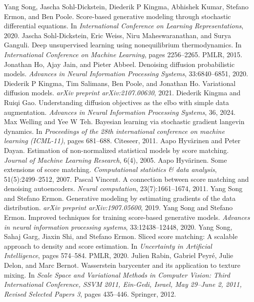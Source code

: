 \begin{chapterreferences}
 Yang Song, Jascha Sohl-Dickstein, Diederik P Kingma, Abhishek Kumar, Stefano Ermon, and Ben Poole. Score-based generative modeling through stochastic differential equations. In \emph{International Conference on Learning Representations}, 2020.
 Jascha Sohl-Dickstein, Eric Weiss, Niru Maheswaranathan, and Surya Ganguli. Deep unsupervised learning using nonequilibrium thermodynamics. In \emph{International Conference on Machine Learning}, pages 2256–2265. PMLR, 2015.
 Jonathan Ho, Ajay Jain, and Pieter Abbeel. Denoising diffusion probabilistic models. \emph{Advances in Neural Information Processing Systems}, 33:6840–6851, 2020.
 Diederik P Kingma, Tim Salimans, Ben Poole, and Jonathan Ho. Variational diffusion models. \emph{arXiv preprint arXiv:2107.00630}, 2021.
 Diederik Kingma and Ruiqi Gao. Understanding diffusion objectives as the elbo with simple data augmentation. \emph{Advances in Neural Information Processing Systems}, 36, 2024.
 Max Welling and Yee W Teh. Bayesian learning via stochastic gradient langevin dynamics. In \emph{Proceedings of the 28th international conference on machine learning (ICML-11)}, pages 681–688. Citeseer, 2011.
 Aapo Hyvärinen and Peter Dayan. Estimation of non-normalized statistical models by score matching. \emph{Journal of Machine Learning Research}, 6(4), 2005.
 Aapo Hyvärinen. Some extensions of score matching. \emph{Computational statistics \& data analysis}, 51(5):2499–2512, 2007.
 Pascal Vincent. A connection between score matching and denoising autoencoders. \emph{Neural computation}, 23(7):1661–1674, 2011.
 Yang Song and Stefano Ermon. Generative modeling by estimating gradients of the data distribution. \emph{arXiv preprint arXiv:1907.05600}, 2019.
 Yang Song and Stefano Ermon. Improved techniques for training score-based generative models. \emph{Advances in neural information processing systems}, 33:12438–12448, 2020.
 Yang Song, Sahaj Garg, Jiaxin Shi, and Stefano Ermon. Sliced score matching: A scalable approach to density and score estimation. In \emph{Uncertainty in Artificial Intelligence}, pages 574–584. PMLR, 2020.
 Julien Rabin, Gabriel Peyré, Julie Delon, and Marc Bernot. Wasserstein barycenter and its application to texture mixing. In \emph{Scale Space and Variational Methods in Computer Vision: Third International Conference, SSVM 2011, Ein-Gedi, Israel, May 29–June 2, 2011, Revised Selected Papers 3}, pages 435–446. Springer, 2012.

\end{chapterreferences}
